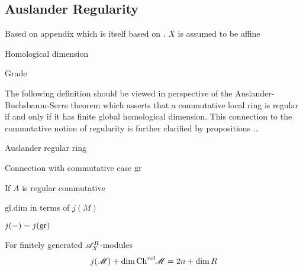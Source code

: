 \subsection{Auslander Regularity}
Based on appendix \cite{budur2019zero} which is itself based on \cite{bjork1979rings}. $X$ is assumed to be affine
\begin{definition}
  Homological dimension
\end{definition}
\begin{definition}
  Grade
\end{definition}
The following definition should be viewed in perspective of  the Auslander-Buchsbaum-Serre theorem which asserts that a commutative local ring is regular if and only if it has finite global homological dimension. This connection to the commutative notion of regularity is further clarified by propositions ...
\begin{definition}
  Auslander regular ring
\end{definition}
\begin{proposition}
  Connection with commutative case $\operatorname{gr}$
\end{proposition}
\begin{proposition}
  If $A$ is regular commutative
\end{proposition}
\begin{proposition}
  gl.dim in terms of $j(M)$
\end{proposition}
\begin{proposition}
  $j({-}) = j(\operatorname{gr})$
\end{proposition}
\begin{corollary}\label{cor: AXRBehaviourGradesJAndChrel}
  For finitely generated $\mathscr{A}_X^R$-modules
  $$j(\mathscr{M}) + \dim \operatorname{Ch}^{rel}\mkern-5mu \mathscr{M} = 2n + \dim R $$
\end{corollary}
